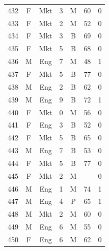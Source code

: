 \documentclass[11pt,a4paper]{article}
\begin{document}
\begin{center}
\begin{tabular}[t]{@{}r c c r c r c@{}}
432 & F & Mkt & 3 & M & 60 & 0 \\
433 & F & Mkt & 2 & M & 52 & 0 \\
434 & F & Mkt & 3 & B & 69 & 0 \\
435 & F & Mkt & 5 & B & 68 & 0 \\
436 & M & Eng & 7 & M & 48 & 1 \\
437 & F & Mkt & 5 & B & 77 & 0 \\
438 & M & Eng & 2 & B & 62 & 0 \\
439 & M & Eng & 9 & B & 72 & 1 \\
440 & F & Mkt & 0 & M & 56 & 0 \\
441 & F & Eng & 3 & B & 52 & 0 \\
442 & F & Mkt & 5 & B & 65 & 0 \\
443 & M & Eng & 7 & B & 53 & 0 \\
444 & F & Mkt & 5 & B & 77 & 0 \\
445 & F & Mkt & 2 & M & -- & 0 \\
446 & M & Eng & 1 & M & 74 & 1 \\
447 & M & Eng & 4 & P & 65 & 1 \\
448 & M & Mkt & 2 & M & 60 & 0 \\
449 & M & Eng & 6 & M & 55 & 0 \\
450 & F & Eng & 6 & M & 62 & 0 \\
\bottomrule
\end{tabular}
\end{center}
\clearpage
\end{document}
